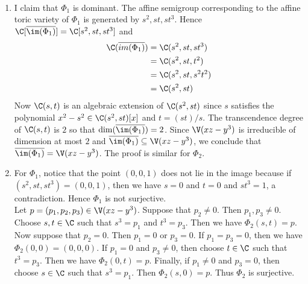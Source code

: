 \documentclass[a4paper]{article}
\begin{document}
\begin{ex}{}{}\\
\begin{enumerate}[label=(\alph*)]
\item I claim that $\Phi_1$ is dominant. The affine semigroup corresponding to the affine toric variety of $\Phi_1$ is generated by $s^2,st,st^3$. Hence $\C[\overline{\im(\Phi_1)}]=\C[s^2,st,st^3]$ and \begin{align*}
\C(\overline{im(\Phi_1)})&=\C(s^2,st,st^3)\\
&=\C(s^2,st,t^2)\\
&=\C(s^2,st,s^2t^2)\\
&=\C(s^2,st)
\end{align*}
Now $\C(s,t)$ is an algebraic extension of $\C(s^2,st)$ since $s$ satisfies the polynomial $x^2-s^2\in\C(s^2,st)[x]$ and $t=(st)/s$. The transcendence degree of $\C(s,t)$ is $2$ so that $\dim(\overline{\im(\Phi_1)})=2$. Since $\V(xz-y^3)$ is irreducible of dimension at most $2$ and $\overline{\im(\Phi_1)}\subseteq\V(xz-y^3)$, we conclude that $\overline{\im(\Phi_1)}=\V(xz-y^3)$. The proof is similar for $\Phi_2$. 
\item For $\Phi_1$, notice that the point $(0,0,1)$ does not lie in the image because if $(s^2,st,st^3)=(0,0,1)$, then we have $s=0$ and $t=0$ and $st^3=1$, a contradiction. Hence $\Phi_1$ is not surjective. \\

Let $p=(p_1,p_2,p_3)\in\V(xz-y^3)$. Suppose that $p_2\neq 0$. Then $p_1,p_3\neq 0$. Choose $s,t\in\C$ such that $s^3=p_1$ and $t^3=p_3$. Then we have $\Phi_2(s,t)=p$. Now suppose that $p_2=0$. Then $p_1=0$ or $p_3=0$. If $p_1=p_3=0$, then we have $\Phi_2(0,0)=(0,0,0)$. If $p_1=0$ and $p_3\neq 0$, then choose $t\in\C$ such that $t^3=p_3$. Then we have $\Phi_2(0,t)=p$. Finally, if $p_1\neq 0$ and $p_3=0$, then choose $s\in\C$ such that $s^3=p_1$. Then $\Phi_2(s,0)=p$. Thus $\Phi_2$ is surjective. 
\end{enumerate}
\end{ex}

\begin{ex}{}{}\\
\end{ex}

\begin{ex}{}{}\\
\end{ex}
\end{document}
